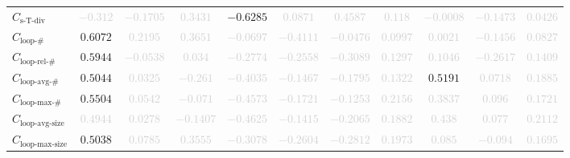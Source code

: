 \documentclass{standalone}
\newcommand{\simpletracedivname}{\text{s-T-div}}
\newcommand{\simpletracediv}{C_{\simpletracedivname}}
\newcommand{\loopnumname}{\text{loop-\#}}
\newcommand{\loopnum}{C_{\loopnumname}}
\newcommand{\looprelnumname}{\text{loop-rel-\#}}
\newcommand{\looprelnum}{C_{\looprelnumname}}
\newcommand{\loopavgname}{\text{loop-avg-\#}}
\newcommand{\loopavg}{C_{\loopavgname}}
\newcommand{\loopmaxname}{\text{loop-max-\#}}
\newcommand{\loopmax}{C_{\loopmaxname}}
\newcommand{\loopavgsizename}{\text{loop-avg-size}}
\newcommand{\loopavgsize}{C_{\loopavgsizename}}
\newcommand{\loopmaxsizename}{\text{loop-max-size}}
\newcommand{\loopmaxsize}{C_{\loopmaxsizename}}
\begin{document}
\begin{tabular}{lcccccccccc}
$\simpletracediv$ & \textcolor{lightgray}{$-0.312$} & \textcolor{lightgray}{$-0.1705$} & \textcolor{lightgray}{$0.3431$} & $-0.6285$ & \textcolor{lightgray}{$0.0871$} & \textcolor{lightgray}{$0.4587$} & \textcolor{lightgray}{$0.118$} & \textcolor{lightgray}{$-0.0008$} & \textcolor{lightgray}{$-0.1473$} & \textcolor{lightgray}{$0.0426$} \\ 
$\loopnum$ & $0.6072$ & \textcolor{lightgray}{$0.2195$} & \textcolor{lightgray}{$0.3651$} & \textcolor{lightgray}{$-0.0697$} & \textcolor{lightgray}{$-0.4111$} & \textcolor{lightgray}{$-0.0476$} & \textcolor{lightgray}{$0.0997$} & \textcolor{lightgray}{$0.0021$} & \textcolor{lightgray}{$-0.1456$} & \textcolor{lightgray}{$0.0827$} \\ 
$\looprelnum$ & $0.5944$ & \textcolor{lightgray}{$-0.0538$} & \textcolor{lightgray}{$0.034$} & \textcolor{lightgray}{$-0.2774$} & \textcolor{lightgray}{$-0.2558$} & \textcolor{lightgray}{$-0.3089$} & \textcolor{lightgray}{$0.1297$} & \textcolor{lightgray}{$0.1046$} & \textcolor{lightgray}{$-0.2617$} & \textcolor{lightgray}{$0.1409$} \\ 
$\loopavg$ & $0.5044$ & \textcolor{lightgray}{$0.0325$} & \textcolor{lightgray}{$-0.261$} & \textcolor{lightgray}{$-0.4035$} & \textcolor{lightgray}{$-0.1467$} & \textcolor{lightgray}{$-0.1795$} & \textcolor{lightgray}{$0.1322$} & $0.5191$ & \textcolor{lightgray}{$0.0718$} & \textcolor{lightgray}{$0.1885$} \\ 
$\loopmax$ & $0.5504$ & \textcolor{lightgray}{$0.0542$} & \textcolor{lightgray}{$-0.071$} & \textcolor{lightgray}{$-0.4573$} & \textcolor{lightgray}{$-0.1721$} & \textcolor{lightgray}{$-0.1253$} & \textcolor{lightgray}{$0.2156$} & \textcolor{lightgray}{$0.3837$} & \textcolor{lightgray}{$0.096$} & \textcolor{lightgray}{$0.1721$} \\ 
$\loopavgsize$ & \textcolor{lightgray}{$0.4944$} & \textcolor{lightgray}{$0.0278$} & \textcolor{lightgray}{$-0.1407$} & \textcolor{lightgray}{$-0.4625$} & \textcolor{lightgray}{$-0.1415$} & \textcolor{lightgray}{$-0.2065$} & \textcolor{lightgray}{$0.1882$} & \textcolor{lightgray}{$0.438$} & \textcolor{lightgray}{$0.077$} & \textcolor{lightgray}{$0.2112$} \\ 
$\loopmaxsize$ & $0.5038$ & \textcolor{lightgray}{$0.0785$} & \textcolor{lightgray}{$0.3555$} & \textcolor{lightgray}{$-0.3078$} & \textcolor{lightgray}{$-0.2604$} & \textcolor{lightgray}{$-0.2812$} & \textcolor{lightgray}{$0.1973$} & \textcolor{lightgray}{$0.085$} & \textcolor{lightgray}{$-0.094$} & \textcolor{lightgray}{$0.1695$} \\ 

\end{tabular}
\end{document}
